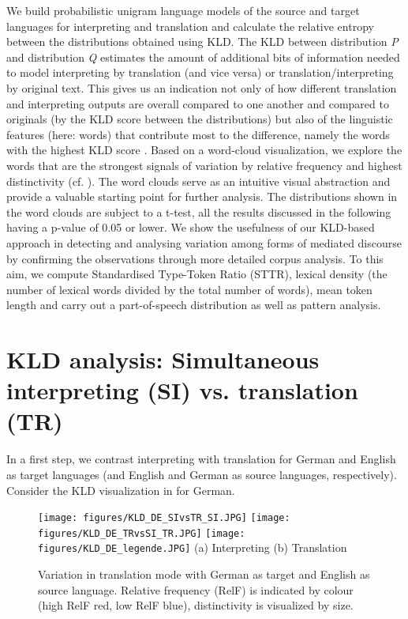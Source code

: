 \documentclass[output=paper,colorlinks,citecolor=brown]{langscibook}
\begin{document}
We build probabilistic unigram language models of the source and target languages for interpreting and translation and calculate the relative entropy between the distributions obtained using KLD. The KLD between distribution \textit{P} and distribution \textit{Q} estimates the amount of additional bits of information needed to model interpreting by translation (and vice versa) or translation/interpreting by original text. This gives us an indication not only of how different translation and interpreting outputs are overall compared to one another and compared to originals (by the KLD score between the distributions) but also of the linguistic features (here: words) that contribute most to the difference, namely the words with the highest KLD score \citep{Fankhauser2014}. Based on a word-cloud visualization, we explore the words that are the strongest signals of variation by relative frequency and highest distinctivity (cf. \cite{Karakantaforthcoming}). The word clouds serve as an intuitive visual abstraction and provide a valuable starting point for further analysis. The distributions shown in the word clouds are subject to a t-test, all the results discussed in the following having a p-value of 0.05 or lower. We show the usefulness of our KLD-based approach in detecting and analysing variation among forms of mediated discourse by confirming the observations through more detailed corpus analysis. To this aim, we compute Standardised Type-Token Ratio (STTR), lexical density (the number of lexical words divided by the total number of words), mean token length and carry out a part-of-speech distribution as well as pattern analysis.


\section{KLD analysis: Simultaneous interpreting (SI) vs. translation (TR)}\label{KLD}

In a first step, we contrast interpreting with translation for German and English as target languages (and English and German as source languages, respectively). Consider the KLD visualization in  for German.

\begin{figure}
\texttt{[image: figures/KLD\_DE\_SIvsTR\_SI.JPG]}
\texttt{[image: figures/KLD\_DE\_TRvsSI\_TR.JPG]}
\texttt{[image: figures/KLD\_DE\_legende.JPG]}
(a) Interpreting \hspace{2cm}	(b) Translation
\caption{\label{fig: DE SI vs TR} Variation in translation mode with German as target and English as source language. Relative frequency (RelF) is indicated by colour (high RelF red, low RelF blue), distinctivity is visualized by size.}
\label{fig:1}
\end{figure}
\end{document}
